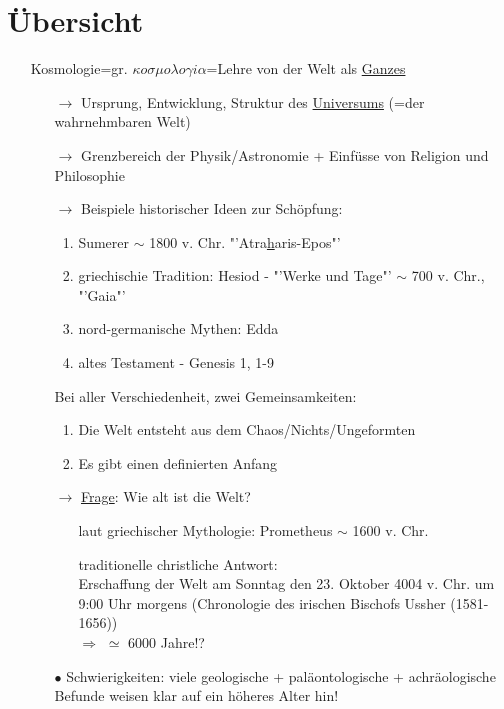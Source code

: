 \section{Übersicht}
\begin{itemize}
	\item[] Kosmologie=gr. $\kappa o \sigma\mu o \lambda o\gamma i \alpha$=Lehre von der Welt als \underline{Ganzes}
		\begin{itemize}
			\item[$\to$] Ursprung, Entwicklung, Struktur des \underline{Universums} (=der wahrnehmbaren Welt)
			\item[$\to$] Grenzbereich der Physik/Astronomie + Einfüsse von Religion und Philosophie
			\item[$\to$] Beispiele historischer Ideen zur Schöpfung:
				\begin{enumerate}[label={(\alph*)}]
					\item Sumerer $\sim $ 1800 v. Chr. "'Atra\underline{h}aris-Epos"'
					\item griechischie Tradition: Hesiod - "'Werke und Tage"' $\sim$ 700 v. Chr., "'Gaia"'
					\item nord-germanische Mythen: Edda
					\item altes Testament - Genesis 1, 1-9
				\end{enumerate}
				Bei aller Verschiedenheit, zwei Gemeinsamkeiten:
				\begin{enumerate}
					\item Die Welt entsteht aus dem Chaos/Nichts/Ungeformten
					\item Es gibt einen definierten Anfang
				\end{enumerate}
			\item[$\to$] \underline{Frage}: Wie alt ist die Welt?
				\begin{itemize}
					\item[] laut griechischer Mythologie: Prometheus $\sim$ 1600 v. Chr.
					\item[] traditionelle christliche Antwort:\\
						Erschaffung der Welt am Sonntag den 23. Oktober 4004 v. Chr. um 9:00 Uhr morgens (Chronologie des irischen Bischofs Ussher (1581-1656))\\
						$\Rightarrow $ $\simeq$ 6000 Jahre!?
				\end{itemize}
			\item[$\bullet$] Schwierigkeiten: viele geologische + paläontologische + achräologische Befunde weisen klar auf ein höheres Alter hin!
				\begin{itemize}

\end{itemize}
\end{itemize}
\end{itemize}
